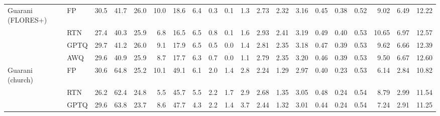 \begin{landscape}
\begin{longtable}{llrrrrrrrrrrrrrrrrrr}
\midrule
Guarani (FLORES+) & FP & 30.5 & 41.7 & 26.0 & 10.0 & 18.6 & 6.4 & 0.3 & 0.1 & 1.3 & 2.73 & 2.32 & 3.16 & 0.45 & 0.38 & 0.52 & 9.02 & 6.49 & 12.22 \\
 & RTN & \cellcolor{loss!41}27.4 & \cellcolor{loss!19}40.3 & \cellcolor{loss!1}25.9 & \cellcolor{loss!23}6.8 & \cellcolor{loss!15}16.5 & 6.5 & \cellcolor{loss!9}0.8 & 0.1 & \cellcolor{loss!6}1.6 & \cellcolor{loss!14}2.93 & \cellcolor{loss!6}2.41 & \cellcolor{loss!2}3.19 & \cellcolor{loss!16}0.49 & \cellcolor{loss!8}0.40 & \cellcolor{loss!4}0.53 & \cellcolor{loss!11}10.65 & \cellcolor{loss!3}6.97 & \cellcolor{loss!2}12.57 \\
 & GPTQ & \cellcolor{loss!10}29.7 & \cellcolor{loss!7}41.2 & 26.0 & \cellcolor{loss!6}9.1 & \cellcolor{loss!5}17.9 & 6.5 & \cellcolor{loss!4}0.5 & 0.0 & \cellcolor{loss!3}1.4 & \cellcolor{loss!6}2.81 & \cellcolor{loss!2}2.35 & \cellcolor{loss!1}3.18 & \cellcolor{loss!7}0.47 & \cellcolor{loss!4}0.39 & \cellcolor{loss!3}0.53 & \cellcolor{loss!4}9.62 & \cellcolor{loss!1}6.66 & \cellcolor{loss!1}12.39 \\
 & AWQ & \cellcolor{loss!11}29.6 & \cellcolor{loss!10}40.9 & \cellcolor{loss!1}25.9 & \cellcolor{loss!9}8.7 & \cellcolor{loss!6}17.7 & \cellcolor{loss!0}6.3 & \cellcolor{loss!7}0.7 & 0.0 & 1.1 & \cellcolor{loss!5}2.79 & \cellcolor{loss!2}2.35 & \cellcolor{loss!3}3.20 & \cellcolor{loss!5}0.46 & \cellcolor{loss!4}0.39 & \cellcolor{loss!4}0.53 & \cellcolor{loss!3}9.50 & \cellcolor{loss!1}6.67 & \cellcolor{loss!3}12.60 \\
\midrule
Guarani (church) & FP & 30.6 & 64.8 & 25.2 & 10.1 & 49.1 & 6.1 & 2.0 & 1.4 & 2.8 & 2.24 & 1.29 & 2.97 & 0.40 & 0.23 & 0.53 & 6.14 & 2.84 & 10.82 \\
 & RTN & \cellcolor{loss!58}26.2 & \cellcolor{loss!32}62.4 & \cellcolor{loss!6}24.8 & \cellcolor{loss!33}5.5 & \cellcolor{loss!24}45.7 & \cellcolor{loss!4}5.5 & \cellcolor{loss!4}2.2 & \cellcolor{loss!6}1.7 & \cellcolor{loss!2}2.9 & \cellcolor{loss!31}2.68 & \cellcolor{loss!4}1.35 & \cellcolor{loss!6}3.05 & \cellcolor{loss!32}0.48 & \cellcolor{loss!4}0.24 & \cellcolor{loss!4}0.54 & \cellcolor{loss!18}8.79 & \cellcolor{loss!1}2.99 & \cellcolor{loss!5}11.54 \\
 & GPTQ & \cellcolor{loss!12}29.6 & \cellcolor{loss!14}63.8 & \cellcolor{loss!20}23.7 & \cellcolor{loss!11}8.6 & \cellcolor{loss!10}47.7 & \cellcolor{loss!12}4.3 & \cellcolor{loss!4}2.2 & \cellcolor{loss!1}1.4 & \cellcolor{loss!17}3.7 & \cellcolor{loss!14}2.44 & \cellcolor{loss!2}1.32 & \cellcolor{loss!3}3.01 & \cellcolor{loss!14}0.44 & \cellcolor{loss!2}0.24 & \cellcolor{loss!4}0.54 & \cellcolor{loss!7}7.24 & \cellcolor{loss!0}2.91 & \cellcolor{loss!3}11.25 \\

\end{longtable}
\end{landscape}

